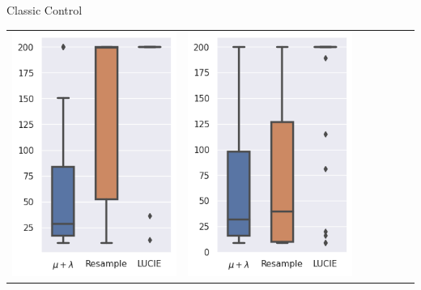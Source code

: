 \begin{frame}{\tcv{} Classic Control}
\begin{table}
\begin{tabular}{ccccccc}
                \includegraphics[width=\figwidth]{images/LUCIE/cartpole/boxplot_cartpole_600.png} &
                \includegraphics[width=\figwidth]{images/LUCIE/cartpole/boxplot_cartpole_800.png}\\
            \end{tabular}
        \end{table}


\end{frame}

